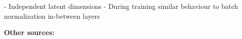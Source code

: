 	- Independent latent dimensions
	- During training similar behaviour to batch normalization in-between layers





\textbf{Other sources:} \\











%


